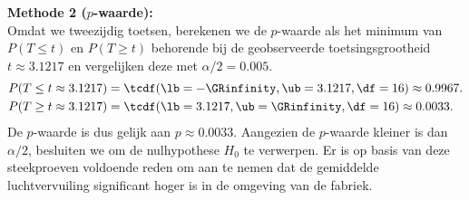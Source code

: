 {    {\noindent\bfseries Methode 2 ($p$-waarde):}\\
    Omdat we tweezijdig toetsen, berekenen we de $p$-waarde als het minimum van $P(T \leq t)$ en $P(T \geq t)$ behorende bij de geobserveerde toetsingsgrootheid $t \approx 3.1217$ en vergelijken deze met $\alpha/2 = 0.005$.
    \begin{align*}
        P(T \leq t \approx 3.1217) &= \tcdf(\lb=-\GRinfinity, \ub=3.1217, \df=16) \approx 0.9967.\\
        P(T \geq t \approx 3.1217) &= \tcdf(\lb=3.1217, \ub=\GRinfinity, \df=16) \approx 0.0033.
    \end{align*}
    De $p$-waarde is dus gelijk aan $p \approx 0.0033$.
    Aangezien de $p$-waarde kleiner is dan $\alpha/2$, besluiten we om de nulhypothese $H_0$ te verwerpen.
    Er is op basis van deze steekproeven voldoende reden om aan te nemen dat de gemiddelde luchtvervuiling significant hoger is in de omgeving van de fabriek.
}